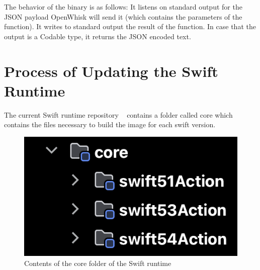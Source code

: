The behavior of the binary is as follows: It listens on standard output for the JSON payload OpenWhisk will send it (which contains the parameters of the function). It writes to standard output the result of the function. In case that the output is a Codable type, it returns the JSON encoded text.


\section{Process of Updating the Swift Runtime}
\label{sec:UpdatingProcess}

The current Swift runtime repository ~\cite{swift-runtime} contains a folder called core which contains the files necessary to build the image for each swift version.
\begin{figure}[h]
    \centering
    \includegraphics[width=\textwidth]{media/core_contents.png}
    \caption{Contents of the core folder of the Swift runtime}
    \label{fig:core_contents}
\end{figure}

